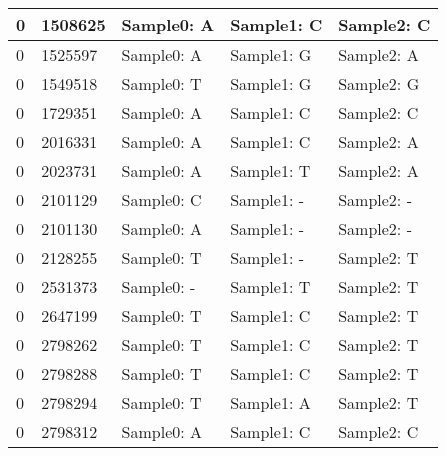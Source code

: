 \begin{longtable}{|l|l|l|l|l|}
	\hline
	0                              & 1508625              & Sample0: A                  & Sample1: C           & Sample2: C            \\ 
	\hline
	0                              & 1525597              & Sample0: A                  & Sample1: G           & Sample2: A            \\ 
	\hline
	0                              & 1549518              & Sample0: T                  & Sample1: G           & Sample2: G            \\ 
	\hline
	0                              & 1729351              & Sample0: A                  & Sample1: C           & Sample2: C            \\ 
	\hline
	0                              & 2016331              & Sample0: A                  & Sample1: C           & Sample2: A            \\ 
	\hline
	0                              & 2023731              & Sample0: A                  & Sample1: T           & Sample2: A            \\ 
	\hline
	0                              & 2101129              & Sample0: C                  & Sample1: -           & Sample2: -            \\ 
	\hline
	0                              & 2101130              & Sample0: A                  & Sample1: -           & Sample2: -            \\ 
	\hline
	0                              & 2128255              & Sample0: T                  & Sample1: -           & Sample2: T            \\ 
	\hline
	0                              & 2531373              & Sample0: -                  & Sample1: T           & Sample2: T            \\ 
	\hline
	0                              & 2647199              & Sample0: T                  & Sample1: C           & Sample2: T            \\ 
	\hline
	0                              & 2798262              & Sample0: T                  & Sample1: C           & Sample2: T            \\ 
	\hline
	0                              & 2798288              & Sample0: T                  & Sample1: C           & Sample2: T            \\ 
	\hline
	0                              & 2798294              & Sample0: T                  & Sample1: A           & Sample2: T            \\ 
	\hline
	0                              & 2798312              & Sample0: A                  & Sample1: C           & Sample2: C            \\ 

\end{longtable}
